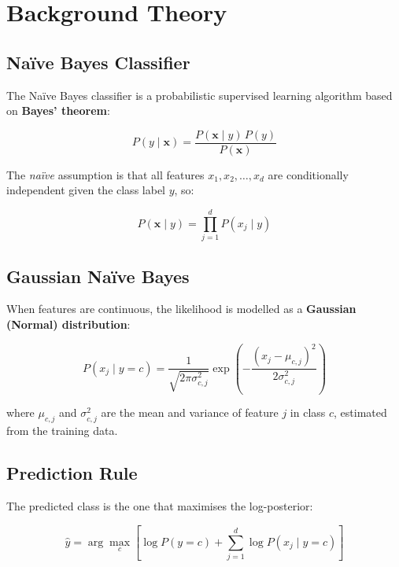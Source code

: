 \documentclass[12pt,a4paper]{article}
\begin{document}
\section{Background Theory}

\subsection{Na\"{i}ve Bayes Classifier}

The Na\"{i}ve Bayes classifier is a probabilistic supervised learning algorithm based on \textbf{Bayes' theorem}:

\begin{equation}
  P(y \mid \mathbf{x}) = \frac{P(\mathbf{x} \mid y)\, P(y)}{P(\mathbf{x})}
  \label{eq:bayes}
\end{equation}

The \emph{na\"{i}ve} assumption is that all features $x_1, x_2, \ldots, x_d$ are conditionally independent given the class label $y$, so:

\begin{equation}
  P(\mathbf{x} \mid y) = \prod_{j=1}^{d} P(x_j \mid y)
  \label{eq:naive}
\end{equation}

\subsection{Gaussian Na\"{i}ve Bayes}

When features are continuous, the likelihood is modelled as a \textbf{Gaussian (Normal) distribution}:

\begin{equation}
  P(x_j \mid y=c) = \frac{1}{\sqrt{2\pi\sigma_{c,j}^2}}
  \exp\!\left(-\frac{(x_j - \mu_{c,j})^2}{2\sigma_{c,j}^2}\right)
  \label{eq:gaussian}
\end{equation}

where $\mu_{c,j}$ and $\sigma_{c,j}^2$ are the mean and variance of feature $j$ in class $c$, estimated from the training data.

\subsection{Prediction Rule}

The predicted class is the one that maximises the log-posterior:

\begin{equation}
  \hat{y} = \arg\max_{c} \left[\log P(y=c) + \sum_{j=1}^{d} \log P(x_j \mid y=c)\right]
  \label{eq:predict}
\end{equation}
\end{document}
